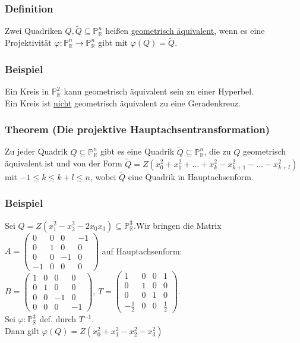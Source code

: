 \documentclass[a4paper]{article}
\newcommand{\ul}{\underline}
\let\phi\varphi
\begin{document}
\subsubsection{Definition}
Zwei Quadriken \(Q,\tilde{Q}\subseteq\mathbb{P}_\mathbb{R}^n\) heißen \ul{geometrisch äquivalent}, wenn es eine Projektivität \(\phi:\mathbb{P}_\mathbb{R}^n\rightarrow\mathbb{P}_\mathbb{R}^n\) gibt mit \(\phi(Q)=\tilde{Q}\).
\subsubsection{Beispiel}
Ein Kreis in \(\mathbb{P}_\mathbb{R}^2\) kann geometrisch äquivalent sein zu einer Hyperbel.\\
Ein Kreis ist \ul{nicht} geometrisch äquivalent zu eine Geradenkreuz.
\subsubsection{Theorem (Die projektive Hauptachsentransformation)}
Zu jeder Quadrik \(Q\subseteq\mathbb{P}_\mathbb{R}^n\) gibt es eine Quadrik \(\tilde{Q}\subseteq\mathbb{P}_\mathbb{R}^n\), die zu \(Q\) geometrisch äquivalent ist und von der Form \(\tilde{Q}=Z(x_0^2+x_1^2+\dots+x_k^2-x_{k+1}^2-\dots-x_{k+l}^2)\) mit \(-1\leq k\leq k+l\leq n\), wobei \(\tilde{Q}\) eine Quadrik in Hauptachsenform.
\subsubsection{Beispiel}
Sei \(Q=Z(x_1^2-x_2^2-2x_0x_3)\subseteq \mathbb{P}_\mathbb{R}^3\).Wir bringen die Matrix \(A=\begin{pmatrix}
0 & 0 & 0 & -1\\
0 & 1 & 0 & 0\\
0 & 0 & -1 & 0\\
-1 & 0 & 0 & 0
\end{pmatrix}\) auf Hauptachsenform:\\
\(B=\begin{pmatrix}
1 & 0 & 0 & 0\\
0 & 1 & 0 & 0\\
0 & 0 & -1 & 0\\
0 & 0 & 0 & -1
\end{pmatrix}\), \(T=\begin{pmatrix}
1 & 0 & 0 & 1\\
0 & 1 & 0 & 0\\
0 & 0 & 1 & 0\\
-\frac{1}{2} & 0 & 0 & \frac{1}{2}
\end{pmatrix}\).\\
Sei \(\phi:\mathbb{P}_\mathbb{R}^3\) def. durch \(T^{-1}\).\\
Dann gilt \(\phi(Q)=Z(x_0^2+x_1^2-x_2^2-x_3^2)\)
\end{document}

